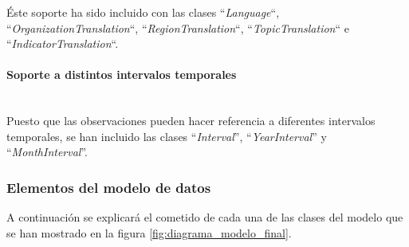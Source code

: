 Éste soporte ha sido incluido con las clases ``\textit{Language}``, ``\textit{OrganizationTranslation}``, ``\textit{RegionTranslation}``, ``\textit{TopicTranslation}`` e ``\textit{IndicatorTranslation}``.

\paragraph{Soporte a distintos intervalos temporales} \hfill \\
Puesto que las observaciones pueden hacer referencia a diferentes intervalos temporales, se han incluido las clases ``\textit{Interval}'', ``\textit{YearInterval}'' y ``\textit{MonthInterval}''.

\subsubsection{Elementos del modelo de datos}
A continuación se explicará el cometido de cada una de las clases del modelo que se han mostrado en la figura \ref{fig:diagrama_modelo_final}.

